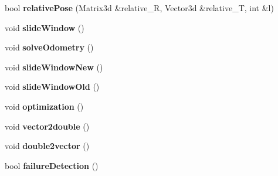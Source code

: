 \begin{DoxyCompactItemize}
$$bool {\bfseries relative\+Pose} (Matrix3d \&relative\+\_\+R, Vector3d \&relative\+\_\+T, int \&l)
\item 
\mbox{\label{classEstimator_ac118df0372730107c7031489b26df117}} 
void {\bfseries slide\+Window} ()
\item 
\mbox{\label{classEstimator_a6586d5b1a4d071f89e13c0a37e46d112}} 
void {\bfseries solve\+Odometry} ()
\item 
\mbox{\label{classEstimator_a6322c2277c69960554c7360ea3932360}} 
void {\bfseries slide\+Window\+New} ()
\item 
\mbox{\label{classEstimator_a6763ef70f085dc18c36e3be425e015ca}} 
void {\bfseries slide\+Window\+Old} ()
\item 
\mbox{\label{classEstimator_a97efa571ccabe805e468ea8e497f86e3}} 
void {\bfseries optimization} ()
\item 
\mbox{\label{classEstimator_a7cef725addfe53cc17f929b7d303ca59}} 
void {\bfseries vector2double} ()
\item 
\mbox{\label{classEstimator_a1018d937f1596d05b7d9a8f119c5985a}} 
void {\bfseries double2vector} ()
\item 
\mbox{\label{classEstimator_a9677152e40b9364ebc279c03ff932c56}} 
bool {\bfseries failure\+Detection} ()
\end{DoxyCompactItemize}
